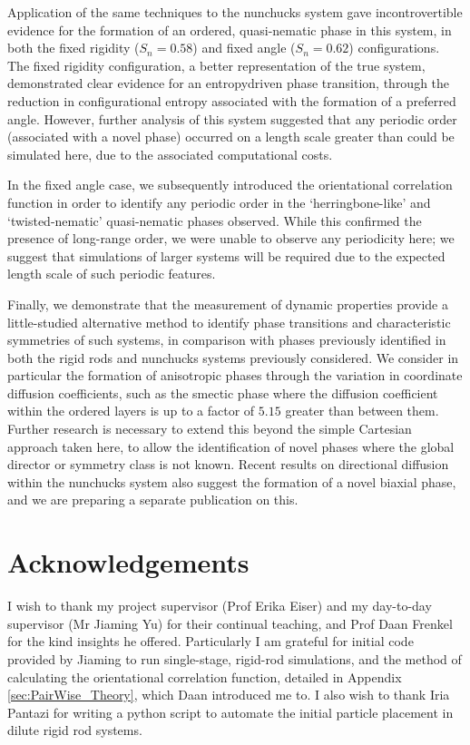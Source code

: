 \documentclass[11pt, a4paper]{article} %
\begin{document}
Application of the same techniques to the nunchucks system gave incontrovertible evidence for the formation of an ordered, quasi-nematic phase in this system, in both the fixed rigidity ($S_{n} = 0.58$) and fixed angle ($S_{n} = 0.62$) configurations. The fixed rigidity configuration, a better representation of the true system, demonstrated clear evidence for an entropy\textendash driven phase transition, through the reduction in configurational entropy associated with the formation of a preferred angle. However, further analysis of this system suggested that any periodic order (associated with a novel phase) occurred on a length scale greater than could be simulated here, due to the associated computational costs.

In the fixed angle case, we subsequently introduced the orientational correlation function in order to identify any periodic order in the `herringbone-like' and `twisted-nematic' quasi-nematic phases observed. While this confirmed the presence of long-range order, we were unable to observe any periodicity here; we suggest that simulations of larger systems will be required due to the expected length scale of such periodic features.

Finally, we demonstrate that the measurement of dynamic properties provide a little-studied alternative method to identify phase transitions and characteristic symmetries of such systems, in comparison with phases previously identified in both the rigid rods and nunchucks systems previously considered. We consider in particular the formation of anisotropic phases through the variation in coordinate diffusion coefficients, such as the smectic phase where the diffusion coefficient within the ordered layers is up to a factor of $5.15$ greater than between them. Further research is necessary to extend this beyond the simple Cartesian approach taken here, to allow the identification of novel phases where the global director or symmetry class is not known. Recent results on directional diffusion within the nunchucks system also suggest the formation of a novel biaxial phase, and we are preparing a separate publication on this.


\section*{Acknowledgements}
I wish to thank my project supervisor (Prof Erika Eiser) and my day-to-day supervisor (Mr Jiaming Yu) for their continual teaching, and Prof Daan Frenkel for the kind insights he offered. Particularly I am grateful for initial code provided by Jiaming to run single-stage, rigid-rod simulations, and the method of calculating the orientational correlation function, detailed in Appendix \ref{sec:PairWise_Theory}, which Daan introduced me to. I also wish to thank Iria Pantazi for writing a python script to automate the initial particle placement in dilute rigid rod systems.
\end{document}
